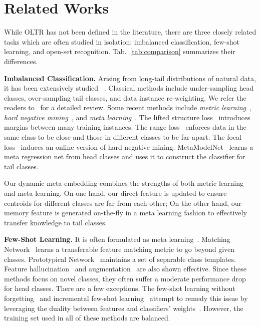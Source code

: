 \documentclass[10pt,twocolumn,letterpaper]{article}
\begin{document}
\section{Related Works}



While OLTR has not been defined in the literature, there are three closely related tasks which are often studied in isolation: imbalanced classification, few-shot learning, and open-set recognition. Tab.~\ref{tab:comparison} summarizes their differences.

\vspace{2pt}
\noindent
\textbf{Imbalanced Classification.}
Arising from long-tail distributions of natural data, it has been extensively studied ~\cite{salakhutdinov2011learning, zhu2014capturing, bengio2015the, liu2015deep, zhu2016we, ouyang2016factors, liu2016deepfashion, van2017devil, cui2018large}.
Classical methods include under-sampling head classes, over-sampling tail classes, and data instance re-weighting. We refer the readers to~\cite{he2008learning} for a detailed review.
Some recent methods include \emph{metric learning}~\cite{huang2016learning, oh2016deep}, \emph{hard negative mining}~\cite{dong2017class, lin2017focal}, and \emph{meta learning}~\cite{ha2016hypernetworks, wang2017learning}. The lifted structure loss~\cite{oh2016deep} introduces margins between many training instances.  The range loss~\cite{zhang2017range} enforces data in the same class to be close and those in different classes to be far apart.
The focal loss~\cite{lin2017focal} induces an online version of hard negative mining.
MetaModelNet~\cite{wang2017learning} learns a meta regression net from head classes and uses it to construct the classifier for tail classes.


Our dynamic meta-embedding combines the strengths of both metric learning and meta learning. On one hand, our direct feature is updated to ensure centroids for different classes are far from each other; On the other hand, our memory feature is generated on-the-fly in a meta learning fashion to effectively transfer knowledge to tail classes.

\vspace{2pt}
\noindent
\textbf{Few-Shot Learning.}
It is often formulated as meta learning~\cite{schmidhuber1993neural, bertinetto2016learning, ravi2016optimization, santoro2016meta, finn2017model, yang2018learning}. 
Matching Network~\cite{vinyals2016matching} learns a transferable feature matching metric to go beyond given classes. Prototypical Network~\cite{snell2017prototypical} maintains a set of separable class templates. 
Feature hallucination~\cite{hariharan2017low} and augmentation~\cite{wang2018low} are also shown effective.
Since these methods focus on novel classes, they often suffer a moderate performance drop for head classes.  There are a few exceptions. The few-shot learning without forgetting~\cite{gidaris2018dynamic} and incremental few-shot learning~\cite{ren2018incremental} attempt to remedy this issue by leveraging the duality between features and classifiers' weights~\cite{qiao2018few, qi2018low}. However, the training set used in all of these methods are balanced.  
\end{document}
